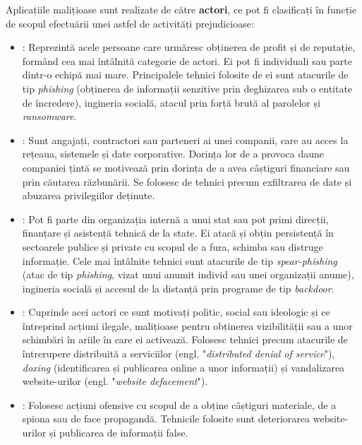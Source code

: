 \documentclass[../../main.tex]{subfiles}
\begin{document}
Aplicațiile malițioase sunt realizate de către \textbf{actori}, ce pot fi clasificați în funcție de scopul efectuării unei astfel de activități prejudicioase:
\begin{itemize}
    \item {}: Reprezintă acele persoane care urmăresc obține\-rea de profit și de reputație, formând cea mai întâlnită categorie de actori. Ei pot fi individuali sau parte dintr-o echipă mai mare. Principalele tehnici folosite de ei sunt atacurile de tip \textit{phishing} (obținerea de informații senzitive prin deghizarea sub o entitate de încredere), ingineria socială, atacul prin forță brută al parolelor și \textit{ransomware}.
    \item {}: Sunt angajați, contractori sau parteneri ai unei companii, care au acces la rețeaua, sistemele și date corporative. Dorința lor de a provoca daune companiei țintă se motivează prin dorința de a avea câștiguri financiare sau prin căutarea răzbunării. Se folosesc de tehnici precum exfiltrarea de date și abuzarea privilegiilor deținute.
    \item {}: Pot fi parte din organizația internă a unui stat sau pot primi direcții, finanțare și asistență tehnică de la state. Ei atacă și obțin persistență în sectoarele publice și private cu scopul de a fura, schimba sau distruge informație. Cele mai întâlnite tehnici sunt atacurile de tip \textit{spear-phishing} (atac de tip \textit{phishing}, vizat unui anumit individ sau unei organizații anume), ingineria socială și accesul de la distanță prin programe de tip \textit{backdoor}.
    \item {}: Cuprinde acei actori ce sunt motivați politic, social sau ideologic și ce întreprind acțiuni ilegale, malițioase pentru obținerea vizi\-bilității sau a unor schimbări în ariile în care ei activează. Folosesc tehnici precum atacurile de întrerupere distribuită a serviciilor (engl. "\textit{distributed denial of service}"), \textit{doxing} (identificarea și publicarea online a unor informații) și vandalizarea website-urilor (engl. "\textit{website defacement}").
    \item {}: Folosesc acțiuni ofensive cu scopul de a obține câștiguri materiale, de a spiona sau de face propagandă. Tehnicile folosite sunt deteriorarea website-urilor și publicarea de informații false.
\end{itemize}
\end{document}
